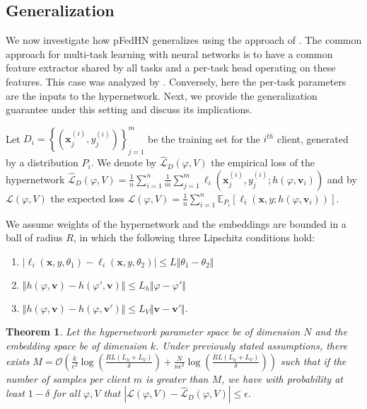\documentclass{article}
\newcommand{\bx}{\boldsymbol{x}}
\newcommand{\bv}{\boldsymbol{v}}
\newtheorem{theorem}{Theorem}
\newcommand\ourmethod{pFedHN}
\begin{document}
\subsection{Generalization}

We now investigate how \ourmethod{} generalizes using the approach of \citet{baxter2000model}. The common approach for multi-task learning with neural networks is to have a common feature extractor shared by all tasks and a per-task head operating on these features. This case was analyzed by \citet{baxter2000model}.
Conversely, here the per-task parameters are the inputs to the hypernetwork. Next, we provide the generalization guarantee under this setting and discuss its implications.





Let $D_i=\left\{(\bx^{(i)}_j,y^{(i)}_j)\right\}_{j=1}^m$ be the training set for the $i^{th}$ client, generated by a distribution $P_i$. We denote by $\hat{\mathcal{L}}_D(\varphi,V)$ the empirical loss of the hypernetwork $\hat{\mathcal{L}}_D(\varphi,V)=\frac{1}{n}\sum_{i=1}^n\frac{1}{m} \sum_{j=1}^{m} \ell_i\left(\bx^{(i)}_j,y^{(i)}_j; h(\varphi,\bv_i)\right)$ and by ${\mathcal{L}}(\varphi,V)$ the expected loss  ${\mathcal{L}}(\varphi,V)=\frac{1}{n}\sum_{i=1}^n\mathbb{E}_{P_i}\left[\ell_i(\bx,y; h(\varphi,\bv_i))\right]$. 

We assume weights of the hypernetwork and the embeddings are bounded in a ball of radius $R$, in which the following three Lipschitz conditions hold:
\begin{enumerate}
    \item $|\ell_i(\bx,y,\theta_1)-\ell_i(\bx,y,\theta_2)|\leq L\Vert\theta_1-\theta_2\Vert$
    \item $\Vert h(\varphi,\bv)-h(\varphi',\bv)\Vert\leq L_h\Vert \varphi-\varphi'\Vert$
    \item $\Vert h(\varphi,\bv)-h(\varphi,\bv')\Vert\leq L_V\Vert\bv-\bv'\Vert$. \quad
\end{enumerate}

\begin{theorem}\label{theory_gen}
 Let the hypernetwork parameter space be of dimension $N$ and the embedding space be of dimension $k$. Under previously stated assumptions, there exists $M=\mathcal{O}\left(\frac{k}{\epsilon^2}\log\left(\frac{RL(L_h+L_V)}{\delta}\right)+\frac{N}{n\epsilon^2}\log\left(\frac{RL(L_h+L_V)}{\delta}\right)\right)$ such that if the number of samples per client $m$ is greater than $M$, we have with probability at least $1-\delta$ for all $\varphi,V$ that $|\mathcal{L}(\varphi,V)- \hat{\mathcal{L}}_D(\varphi,V)|\leq\epsilon.$
\end{theorem}
\end{document}
